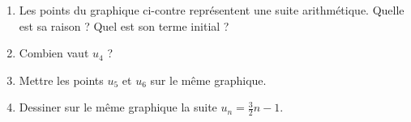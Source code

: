 
\begin{exercice}\label{exosmath-0165}

    \begin{multicols}{2}

        \begin{enumerate}
            \item
    Les points du graphique ci-contre représentent une suite arithmétique. Quelle est sa raison ? Quel est son terme initial ?
        \item
        Combien vaut \( u_4\) ?
    \item
        Mettre les points \( u_5\) et \( u_6\) sur le même graphique.
    \item
        Dessiner sur le même graphique la suite \( u_n=\frac{ 3 }{2}n-1\).

        \end{enumerate}

    \columnbreak


    \begin{center}

    \end{center}

    \end{multicols}
    
\end{exercice}
